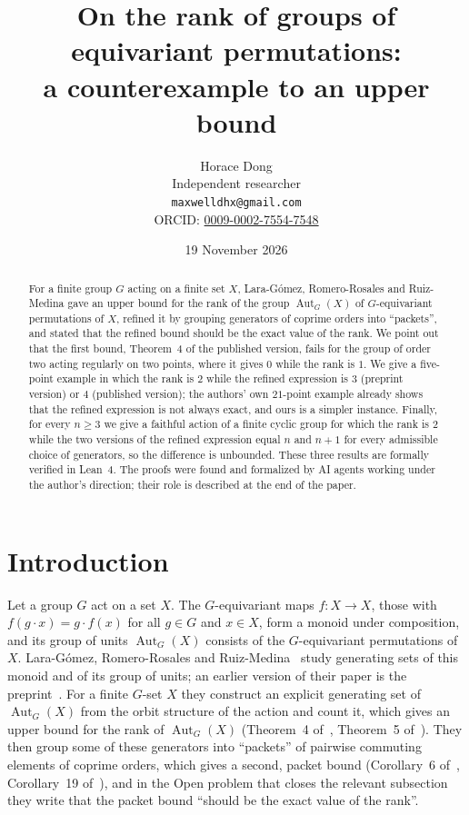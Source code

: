 \documentclass[11pt]{article}
\title{On the rank of groups of equivariant permutations:\\
a counterexample to an upper bound}
\author{Horace Dong\\ \small Independent researcher\\
\small\texttt{maxwelldhx@gmail.com}\\
\small ORCID: \href{https://orcid.org/0009-0002-7554-7548}{0009-0002-7554-7548}}
\date{19 November 2026}
\theoremstyle{remark}
\newcommand{\Aut}{\operatorname{Aut}}
\begin{document}
\maketitle

\begin{abstract}
For a finite group $G$ acting on a finite set $X$, Lara-G\'omez,
Romero-Rosales and Ruiz-Medina gave an upper bound for the rank of the group
$\Aut_G(X)$ of $G$-equivariant permutations of $X$, refined it by grouping
generators of coprime orders into ``packets'', and stated that the refined
bound should be the exact value of the rank. We point out that the first
bound, Theorem~4 of the published version, fails for the group of order two
acting regularly on two points, where it gives $0$ while the rank is $1$. We
give a five-point example in which the rank is $2$ while the refined
expression is $3$ (preprint version) or $4$ (published version); the authors'
own $21$-point example already shows that the refined expression is not
always exact, and ours is a simpler instance. Finally, for every $n\ge3$ we
give a faithful action of a finite cyclic group for which the rank is $2$
while the two versions of the refined expression equal $n$ and $n+1$ for
every admissible choice of generators, so the difference is unbounded. These
three results are formally verified in Lean~4. The proofs were found and
formalized by AI agents working under the author's direction; their role is
described at the end of the paper.
\end{abstract}

\section{Introduction}

Let a group $G$ act on a set $X$. The $G$-equivariant maps $f\colon X\to X$,
those with $f(g\cdot x)=g\cdot f(x)$ for all $g\in G$ and $x\in X$, form a
monoid under composition, and its group of units $\Aut_G(X)$ consists of the
$G$-equivariant permutations of $X$. Lara-G\'omez, Romero-Rosales and
Ruiz-Medina~\cite{lrr} study generating sets of this monoid and of its group of
units; an earlier version of their paper is the preprint~\cite{rlr}. For a
finite $G$-set $X$ they construct an explicit generating set of $\Aut_G(X)$
from the orbit structure of the action and count it, which gives an upper
bound for the rank of $\Aut_G(X)$ (Theorem~4 of~\cite{lrr}, Theorem~5
of~\cite{rlr}). They then group some of these generators into ``packets'' of
pairwise commuting elements of coprime orders, which gives a second, packet
bound (Corollary~6 of~\cite{lrr}, Corollary~19 of~\cite{rlr}), and in the
Open problem that closes the relevant subsection they write that the packet
bound ``should be the exact value of the rank''.
\end{document}
